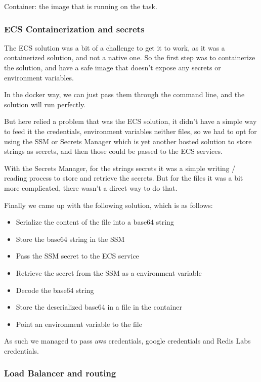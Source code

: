 Container: the image that is running on the task.

\subsubsection {ECS Containerization and secrets}

The ECS solution was a bit of a challenge to get it to work,
as it was a containerized solution, and not a native one.
So the first step was to containerize the solution, and have a safe image 
that doesn't expose any secrets or environment variables.

In the docker way, we can just pass them through the command line,
and the solution will run perfectly.

But here relied a problem that was the ECS solution, it didn't have a simple
way to feed it the credentials, environment variables neither files, so we had to opt
for using the SSM or Secrets Manager
which is yet another hosted solution to store strings as secrets, and then those could be 
passed to the ECS services.

With the Secrets Manager, for the strings secrets it was a simple writing / reading process
to store and retrieve the secrets. But for the files it was a bit more complicated, there
wasn't a direct way to do that.

Finally we came up with the following solution, which is as follows:

\begin{itemize}
    \item Serialize the content of the file into a base64 string
    \item Store the base64 string in the SSM
    \item Pass the SSM secret to the ECS service
    \item Retrieve the secret from the SSM as a environment variable
    \item Decode the base64 string
    \item Store the deserialized base64 in a file in the container
    \item Point an environment variable to the file
\end{itemize}

As such we managed to pass aws credentials, google credentials and Redis Labs credentials.

\subsubsection {Load Balancer and routing}

